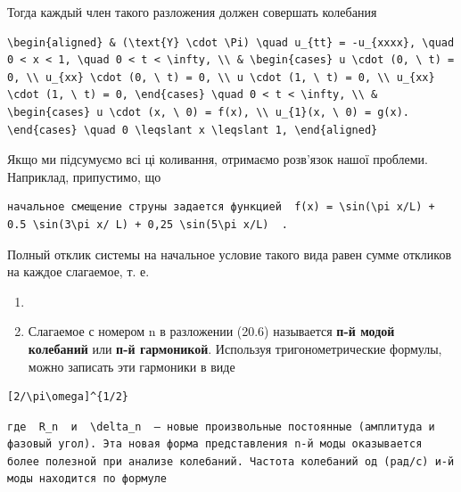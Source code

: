 \documentclass[
  ukrainian,
]{article}
\providecommand{\tightlist}{%
  \setlength{\itemsep}{0pt}\setlength{\parskip}{0pt}}
\begin{document}
Тогда каждый член такого разложения должен совершать колебания

\begin{verbatim}
\begin{aligned} & (\text{Y} \cdot \Pi) \quad u_{tt} = -u_{xxxx}, \quad 0 < x < 1, \quad 0 < t < \infty, \\ & \begin{cases} u \cdot (0, \ t) = 0, \\ u_{xx} \cdot (0, \ t) = 0, \\ u \cdot (1, \ t) = 0, \\ u_{xx} \cdot (1, \ t) = 0, \end{cases} \quad 0 < t < \infty, \\ & \begin{cases} u \cdot (x, \ 0) = f(x), \\ u_{1}(x, \ 0) = g(x). \end{cases} \quad 0 \leqslant x \leqslant 1, \end{aligned}
\end{verbatim}

Якщо ми підсумуємо всі ці коливання, отримаємо розв'язок нашої проблеми.
Наприклад, припустимо, що

\begin{verbatim}
начальное смещение струны задается функцией  f(x) = \sin(\pi x/L) + 0.5 \sin(3\pi x/ L) + 0,25 \sin(5\pi x/L)  .
\end{verbatim}

Полный отклик системы на начальное условие такого вида равен сумме
откликов на каждое слагаемое, т. е.

\begin{enumerate}
\def\labelenumi{\arabic{enumi}.}
\setcounter{enumi}{3}
\tightlist
\item
\item
  Слагаемое с номером n в разложении (20.6) называется \textbf{п-й модой
  колебаний} или \textbf{п-й гармоникой}. Используя тригонометрические
  формулы, можно записать эти гармоники в виде
\end{enumerate}

\begin{verbatim}
[2/\pi\omega]^{1/2}
\end{verbatim}

\begin{verbatim}
где  R_n  и  \delta_n  — новые произвольные постоянные (амплитуда и фазовый угол). Эта новая форма представления n-й моды оказывается более полезной при анализе колебаний. Частота колебаний од (рад/с) и-й моды находится по формуле
\end{verbatim}
\end{document}

